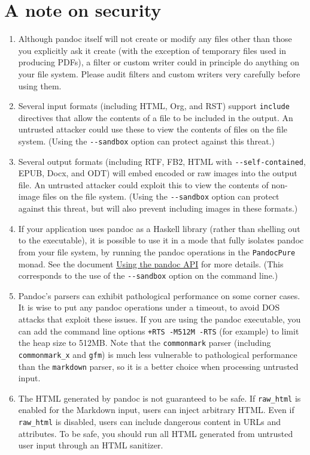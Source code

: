 \documentclass[
  a4paper,
]{article}
\begin{document}
\hypertarget{a-note-on-security}{%
\section{A note on security}\label{a-note-on-security}}

\begin{enumerate}
\def\labelenumi{\arabic{enumi}.}
\item
  Although pandoc itself will not create or modify any files other than
  those you explicitly ask it create (with the exception of temporary
  files used in producing PDFs), a filter or custom writer could in
  principle do anything on your file system. Please audit filters and
  custom writers very carefully before using them.
\item
  Several input formats (including HTML, Org, and RST) support
  \texttt{include} directives that allow the contents of a file to be
  included in the output. An untrusted attacker could use these to view
  the contents of files on the file system. (Using the
  \texttt{-\/-sandbox} option can protect against this threat.)
\item
  Several output formats (including RTF, FB2, HTML with
  \texttt{-\/-self-contained}, EPUB, Docx, and ODT) will embed encoded
  or raw images into the output file. An untrusted attacker could
  exploit this to view the contents of non-image files on the file
  system. (Using the \texttt{-\/-sandbox} option can protect against
  this threat, but will also prevent including images in these formats.)
\item
  If your application uses pandoc as a Haskell library (rather than
  shelling out to the executable), it is possible to use it in a mode
  that fully isolates pandoc from your file system, by running the
  pandoc operations in the \texttt{PandocPure} monad. See the document
  \href{https://pandoc.org/using-the-pandoc-api.html}{Using the pandoc
  API} for more details. (This corresponds to the use of the
  \texttt{-\/-sandbox} option on the command line.)
\item
  Pandoc's parsers can exhibit pathological performance on some corner
  cases. It is wise to put any pandoc operations under a timeout, to
  avoid DOS attacks that exploit these issues. If you are using the
  pandoc executable, you can add the command line options
  \texttt{+RTS\ -M512M\ -RTS} (for example) to limit the heap size to
  512MB. Note that the \texttt{commonmark} parser (including
  \texttt{commonmark\_x} and \texttt{gfm}) is much less vulnerable to
  pathological performance than the \texttt{markdown} parser, so it is a
  better choice when processing untrusted input.
\item
  The HTML generated by pandoc is not guaranteed to be safe. If
  \texttt{raw\_html} is enabled for the Markdown input, users can inject
  arbitrary HTML. Even if \texttt{raw\_html} is disabled, users can
  include dangerous content in URLs and attributes. To be safe, you
  should run all HTML generated from untrusted user input through an
  HTML sanitizer.
\end{enumerate}
\end{document}
